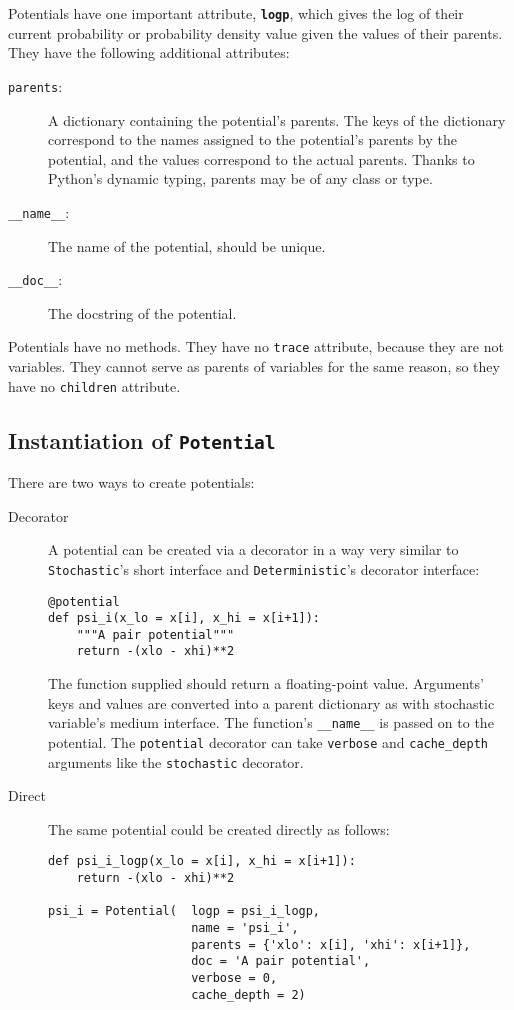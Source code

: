 \bigskip
Potentials have one important attribute, \texttt{\bfseries logp}, which gives the log of their current probability or probability density value given the values of their parents. They have the following additional attributes:
\begin{description}
    \item[\texttt{parents}:] A dictionary containing the potential's parents. The keys of the dictionary correspond to the names assigned to the potential's parents by the potential, and the values correspond to the actual parents. Thanks to Python's dynamic typing, parents may be of any class or type.
    \item[\texttt{__name__}:] The name of the potential, should be unique.
    \item[\texttt{__doc__}:] The docstring of the potential.
\end{description}
Potentials have no methods. They have no \texttt{trace} attribute, because they are not variables. They cannot serve as parents of variables for the same reason, so they have no \texttt{children} attribute.


\subsection*{Instantiation of \texttt{Potential}}
There are two ways to create potentials:
\begin{description}
    \item[Decorator] A potential can be created via a decorator in a way very similar to \texttt{Stochastic}'s short interface and \texttt{Deterministic}'s decorator interface:
\begin{verbatim}
@potential
def psi_i(x_lo = x[i], x_hi = x[i+1]):
    """A pair potential"""
    return -(xlo - xhi)**2
\end{verbatim}
The function supplied should return a floating-point value. Arguments' keys and values are converted into a parent dictionary as with stochastic variable's medium interface. The function's \texttt{__name__} is passed on to the potential. The \texttt{potential} decorator can take \texttt{verbose} and \texttt{cache_depth} arguments like the \texttt{stochastic} decorator.
    \item[Direct] The same potential could be created directly as follows:
\begin{verbatim}
def psi_i_logp(x_lo = x[i], x_hi = x[i+1]):
    return -(xlo - xhi)**2
        
psi_i = Potential(  logp = psi_i_logp, 
                    name = 'psi_i',
                    parents = {'xlo': x[i], 'xhi': x[i+1]},
                    doc = 'A pair potential',
                    verbose = 0,
                    cache_depth = 2)
\end{verbatim}
\end{description}


